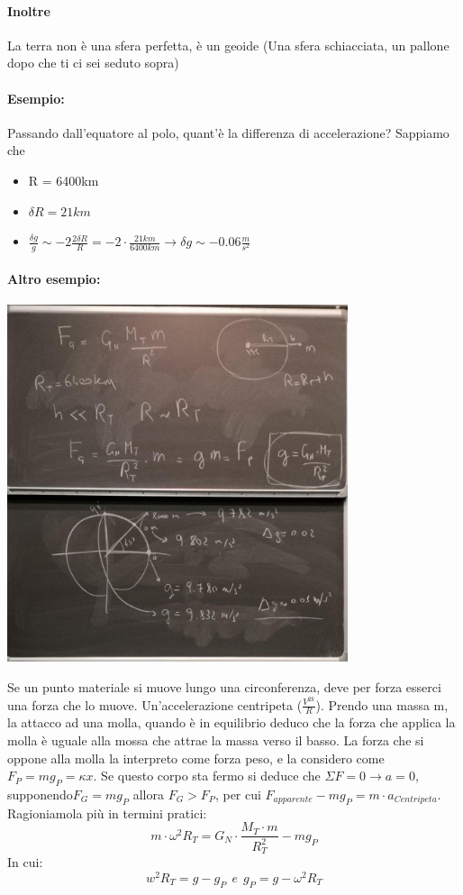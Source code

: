 \documentclass[12pt, a4paper, openany, oneside]{book}
\begin{document}
\paragraph{Inoltre }La terra non è una sfera perfetta, è un geoide (Una sfera 
schiacciata, un pallone dopo che ti ci sei seduto sopra)
\paragraph{Esempio: }
Passando dall'equatore al polo, quant'è la differenza di accelerazione?
Sappiamo che
\begin{itemize}
	\item R = 6400km
	\item $\delta R = 21km$
	\item $\frac{\delta g}{g} \sim -2 \frac{2\delta R}{R} = -2\cdot \frac{21km}{6400km}
	\to \delta g \sim - 0.06 \frac{m}{s^{2}}$
\end{itemize}
\paragraph{Altro esempio: }
\begin{center}
\includegraphics[width=0.75\textwidth]{4}
\end{center}
Se un punto materiale si muove lungo una circonferenza, deve per forza esserci 
una forza che lo muove. Un'accelerazione centripeta ($\frac{V^{2k}}{R}$). 
Prendo una massa m, la attacco ad una molla, quando è in equilibrio deduco che
la forza che applica la molla è uguale alla mossa che attrae la massa verso il 
basso. La forza che si oppone alla molla la interpreto come forza peso, e la
considero come $F_{P} = mg_{P} = \kappa x$. Se questo corpo sta fermo si deduce
che $\Sigma F = 0 \to a = 0$, supponendo$ F_{G} = mg_{P}$ allora $F_{G} > F_{P}$,
per cui $F_{apparente} - mg_{P} = m\cdot a_{Centripeta}$. Ragioniamola più in
termini pratici: 
\[
m\cdot \omega^{2} R_{T} = G_{N}\cdot \frac{M_{T}\cdot m}{R_{T}^{2}}-mg_{P} 
\]	
In cui:
\[
w^{2}R_{T} = g - g_{P} ~~e~~ g_{P} = g - \omega^{2}R_{T} 
\]
\end{document}
